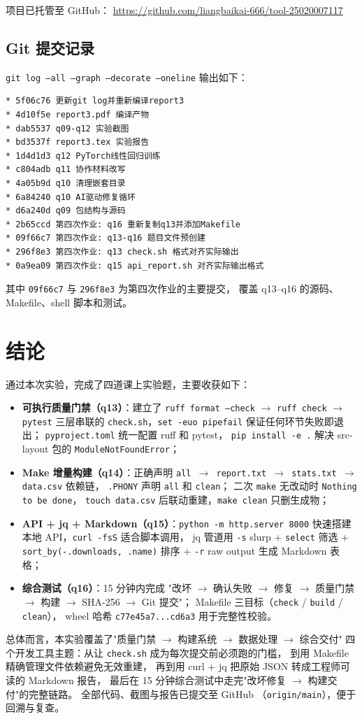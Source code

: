 \documentclass[a4paper,11pt]{ctexart}
\begin{document}
项目已托管至 GitHub：
\url{https://github.com/liangbaikai-666/tool-25020007117}

\subsection{Git 提交记录}

\texttt{git log --all --graph --decorate --oneline} 输出如下：

\begin{lstlisting}[language=bash, numbers=none]
* 5f06c76 更新git log并重新编译report3
* 4d10f5e report3.pdf 编译产物
* dab5537 q09-q12 实验截图
* bd3537f report3.tex 实验报告
* 1d4d1d3 q12 PyTorch线性回归训练
* c804adb q11 协作材料改写
* 4a05b9d q10 清理嵌套目录
* 6a84240 q10 AI驱动修复循环
* d6a240d q09 包结构与源码
* 2b65ccd 第四次作业: q16 重新复制q13并添加Makefile
* 09f66c7 第四次作业: q13-q16 题目文件预创建
* 296f8e3 第四次作业: q13 check.sh 格式对齐实际输出
* 0a9ea09 第四次作业: q15 api_report.sh 对齐实际输出格式
\end{lstlisting}

其中 \texttt{09f66c7} 与 \texttt{296f8e3} 为第四次作业的主要提交，
覆盖 q13--q16 的源码、Makefile、shell 脚本和测试。

\section{结论}

通过本次实验，完成了四道课上实验题，主要收获如下：

\begin{itemize}
  \item \textbf{可执行质量门禁（q13）}：建立了
        \texttt{ruff format --check} $\to$ \texttt{ruff check} $\to$ \texttt{pytest}
        三层串联的 \texttt{check.sh}，\texttt{set -euo pipefail} 保证任何环节失败即退出；
        \texttt{pyproject.toml} 统一配置 ruff 和 pytest，
        \texttt{pip install -e .} 解决 src-layout 包的 \texttt{ModuleNotFoundError}；
  \item \textbf{Make 增量构建（q14）}：正确声明
        \texttt{all $\to$ report.txt $\to$ stats.txt $\to$ data.csv} 依赖链，
        \texttt{.PHONY} 声明 \texttt{all} 和 \texttt{clean}；
        二次 \texttt{make} 无改动时 \texttt{Nothing to be done}，
        \texttt{touch data.csv} 后联动重建，\texttt{make clean} 只删生成物；
  \item \textbf{API + jq + Markdown（q15）}：\texttt{python -m http.server 8000}
        快速搭建本地 API，\texttt{curl -fsS} 适合脚本调用，
        jq 管道用 \texttt{-s} slurp + \texttt{select} 筛选 +
        \texttt{sort\_by(-.downloads, .name)} 排序 + \texttt{-r} raw output 生成 Markdown 表格；
  \item \textbf{综合测试（q16）}：15 分钟内完成
        "改坏 $\to$ 确认失败 $\to$ 修复 $\to$ 质量门禁 $\to$ 构建 $\to$ SHA-256 $\to$ Git 提交"；
        Makefile 三目标（\texttt{check} / \texttt{build} / \texttt{clean}），
        wheel 哈希 \texttt{c77e45a7...cd6a3} 用于完整性校验。
\end{itemize}

总体而言，本实验覆盖了"质量门禁 $\to$ 构建系统 $\to$ 数据处理 $\to$ 综合交付"
四个开发工具主题：从让 \texttt{check.sh} 成为每次提交前必须跑的门槛，
到用 Makefile 精确管理文件依赖避免无效重建，
再到用 curl + jq 把原始 JSON 转成工程师可读的 Markdown 报告，
最后在 15 分钟综合测试中走完"改坏修复 $\to$ 构建交付"的完整链路。
全部代码、截图与报告已提交至 GitHub
（\texttt{origin/main}），便于回溯与复查。
\end{document}
